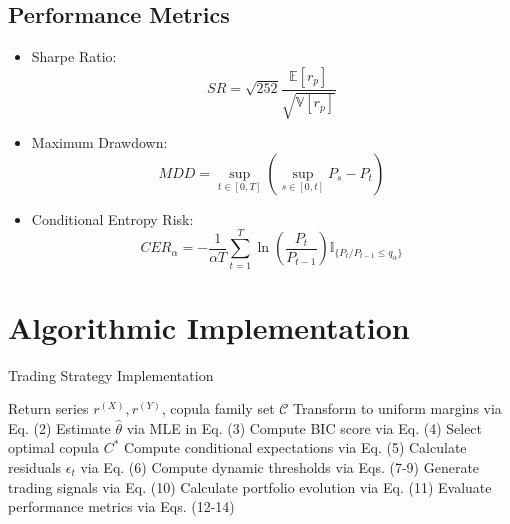 \subsection{Performance Metrics}
\begin{itemize}
    \item Sharpe Ratio:
    \begin{equation}
        SR = \sqrt{252}\frac{\mathbb{E}[r_p]}{\sqrt{\mathbb{V}[r_p]}}
    \end{equation}
    
    \item Maximum Drawdown:
    \begin{equation}
        MDD = \sup_{t \in [0,T]} \left( \sup_{s \in [0,t]} P_s - P_t \right)
    \end{equation}

    \item Conditional Entropy Risk:
    \begin{equation}
        CER_\alpha = -\frac{1}{\alpha T}\sum_{t=1}^T \ln\left(\frac{P_t}{P_{t-1}}\right)\mathbb{I}_{\{P_t/P_{t-1} \leq q_\alpha\}}
    \end{equation}
\end{itemize}


\section{Algorithmic Implementation}
\begin{algorithm}
\caption{Trading Strategy Implementation}
\begin{algorithmic}[1]
    \Require Return series $r^{(X)},r^{(Y)}$, copula family set $\mathcal{C}$
    \State Transform to uniform margins via Eq. (2)
        \State Estimate $\hat{\theta}$ via MLE in Eq. (3)
        \State Compute BIC score via Eq. (4)
    \EndFor
    \State Select optimal copula $C^*$
    \State Compute conditional expectations via Eq. (5)
    \State Calculate residuals $\epsilon_t$ via Eq. (6)
    \State Compute dynamic thresholds via Eqs. (7-9)
    \State Generate trading signals via Eq. (10)
    \State Calculate portfolio evolution via Eq. (11)
    \State Evaluate performance metrics via Eqs. (12-14)
\end{algorithmic}
\end{algorithm}
